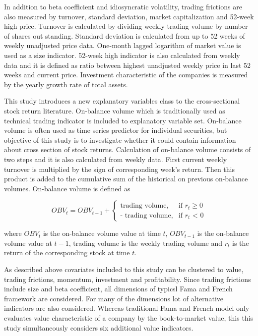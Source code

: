 \documentclass{article}
\begin{document}

In addition to beta coefficient and idiosyncratic volatility, trading frictions are also measured by turnover, standard deviation, market capitalization and 52-week high price. Turnover is calculated by dividing weekly trading volume by number of shares out standing. Standard deviation is calculated from up to 52 weeks of weekly unadjusted price data. One-month lagged logarithm of market value is used as a size indicator. 52-week high indicator is also calculated from weekly data and it is defined as ratio between highest unadjusted weekly price in last 52 weeks and current price. Investment characteristic of the companies is measured by the yearly growth rate of total assets. \par

This study introduces a new explanatory variables class to the cross-sectional stock return literature. On-balance volume which is traditionally used as technical trading indicator is included to explanatory variable set. On-balance volume is often used as time series predictor for individual securities, but objective of this study is to investigate whether it could contain information about cross section of stock returns. Calculation of on-balance volume consists of two steps and it is also calculated from weekly data. First current weekly turnover is multiplied by the sign of corresponding week's return. Then this product is added to the cumulative sum of the historical on previous on-balance volumes. On-balance volume is defined as \par

\begin{equation}
\label{eq:OBV}
OBV_t = OBV_{t-1} + 
\begin{cases}
    \text{trading volume}, 	& \text{if $r_t$} \geq \text{0}\\
    \text{- trading volume},	& \text{if $r_t$ < 0}
\end{cases}
\end{equation}

where $OBV_t$ is the on-balance volume value at time $t$, $OBV_{t-1}$ is the on-balance volume value at $t-1$, trading volume is the weekly trading volume and $r_t$ is the return of the corresponding stock at time $t$. \par

As described above covariates included to this study can be clustered to value, trading frictions, momentum, investment and profitability. Since trading frictions include size and beta coefficient, all dimensions of typicsl Fama and French framework are considered. For many of the dimensions lot of alternative indicators are also considered. Whereas traditional Fama and French \citeyear{FAMA19933} model only evaluates value characteristic of a company by the book-to-market value, this this study simultaneously considers six additional value indicators. \par
\end{document}
